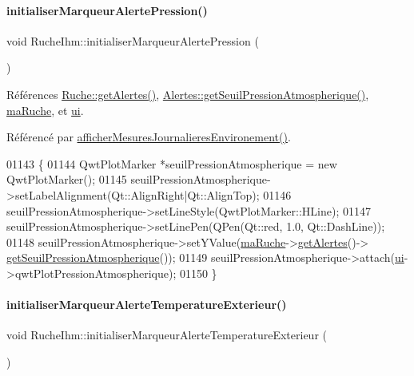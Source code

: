 \paragraph{\texorpdfstring{initialiser\+Marqueur\+Alerte\+Pression()}{initialiserMarqueurAlertePression()}}
{\footnotesize\ttfamily void Ruche\+Ihm\+::initialiser\+Marqueur\+Alerte\+Pression (\begin{DoxyParamCaption}{ }\end{DoxyParamCaption})\hspace{0.3cm}{\ttfamily [private]}}



Références \hyperlink{class_ruche_a9edbc2e81ccb2cb76de43639bcb16ec1}{Ruche\+::get\+Alertes()}, \hyperlink{class_alertes_a502fa36037246fb6eaad1db859bc1971}{Alertes\+::get\+Seuil\+Pression\+Atmospherique()}, \hyperlink{class_ruche_ihm_a43a6b1fa31f4fba58d919daae3707b38}{ma\+Ruche}, et \hyperlink{class_ruche_ihm_a64786058bd7f88ca2f1e9743bb27c25b}{ui}.



Référencé par \hyperlink{class_ruche_ihm_a5ee5942435915ca134765f42ff4b9061}{afficher\+Mesures\+Journalieres\+Environement()}.


\begin{DoxyCode}
01143 \{
01144     QwtPlotMarker *seuilPressionAtmospherique = \textcolor{keyword}{new} QwtPlotMarker();
01145     seuilPressionAtmospherique->setLabelAlignment(Qt::AlignRight|Qt::AlignTop);
01146     seuilPressionAtmospherique->setLineStyle(QwtPlotMarker::HLine);
01147     seuilPressionAtmospherique->setLinePen(QPen(Qt::red, 1.0, Qt::DashLine));
01148     seuilPressionAtmospherique->setYValue(\hyperlink{class_ruche_ihm_a43a6b1fa31f4fba58d919daae3707b38}{maRuche}->\hyperlink{class_ruche_a9edbc2e81ccb2cb76de43639bcb16ec1}{getAlertes}()->
      \hyperlink{class_alertes_a502fa36037246fb6eaad1db859bc1971}{getSeuilPressionAtmospherique}());
01149     seuilPressionAtmospherique->attach(\hyperlink{class_ruche_ihm_a64786058bd7f88ca2f1e9743bb27c25b}{ui}->qwtPlotPressionAtmospherique);
01150 \}
\end{DoxyCode}
\mbox{\label{class_ruche_ihm_a410bcf0b7ac3ea7134af65d479802c48}} 
\paragraph{\texorpdfstring{initialiser\+Marqueur\+Alerte\+Temperature\+Exterieur()}{initialiserMarqueurAlerteTemperatureExterieur()}}
{\footnotesize\ttfamily void Ruche\+Ihm\+::initialiser\+Marqueur\+Alerte\+Temperature\+Exterieur (\begin{DoxyParamCaption}{ }\end{DoxyParamCaption})\hspace{0.3cm}{\ttfamily [private]}}



